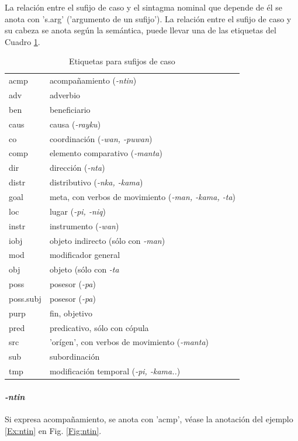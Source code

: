 \documentclass[a4paper,11pt,DIV12]{scrartcl}
\begin{document}
La relaci\'on entre el sufijo de caso y el sintagma nominal que depende de \'el se anota con 's.arg' ('argumento de un sufijo'). La relaci\'on entre el sufijo de caso y su cabeza se anota seg\'un la sem\'antica, puede llevar una de las etiquetas del Cuadro \ref{Tab:CaseLabels}.

\begin{table}
\caption{Etiquetas para sufijos de caso}\label{Tab:CaseLabels}
 \begin{center}
\begin{tabular}{ll}
\toprule
acmp & acompa\~namiento ({\em -ntin})\\
adv & adverbio\\
ben & beneficiario\\
caus & causa ({\em -rayku})\\
co & coordinaci\'on ({\em -wan, -puwan})\\
comp & elemento comparativo ({\em -manta})\\
dir & direcci\'on ({\em -nta})\\
distr & distributivo ({\em -nka, -kama})\\
goal & meta, con verbos de movimiento ({\em -man, -kama, -ta})\\
loc & lugar ({\em -pi, -niq})\\
instr & instrumento ({\em -wan})\\
iobj & objeto indirecto (s\'olo con {\em -man})\\
mod & modificador general\\
obj & objeto (s\'olo con {\em -ta}\\
poss & posesor ({\em -pa})\\
poss.subj & posesor ({\em -pa})\\
purp & fin, objetivo \\
pred & predicativo, s\'olo con c\'opula\\
src & 'or\'igen', con verbos de movimiento ({\em -manta}) \\
sub & subordinaci\'on\\
tmp & modificaci\'on temporal ({\em -pi, -kama..})\\
\bottomrule
\end{tabular}
\end{center}
\end{table}


\paragraph{{\em -ntin}} 
Si expresa acompa\~namiento, se anota con 'acmp', v\'ease la anotaci\'on del ejemplo \ref{Ex:ntin} en Fig. \ref{Fig:ntin}. 
\end{document}
